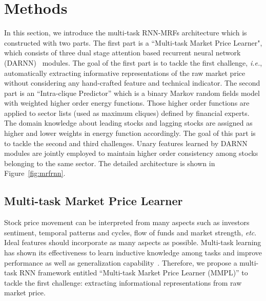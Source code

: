 \section{Methods}
\label{sec:meth}

In this section, we introduce the multi-task RNN-MRFs
architecture which is constructed with two parts. The first part
is a ``Multi-task Market Price Learner", which consists of three
dual stage attention based recurrent neural network
(DARNN)~\cite{qin2017dual} modules. The goal of the first part is
to tackle the first challenge, \textit{i.e.}, automatically
extracting informative representations of the raw market price
without considering any hand-crafted feature and technical
indicator. The second part is an ``Intra-clique Predictor'' which
is a binary Markov random fields model with
weighted higher order energy functions. Those higher order
functions are applied to sector lists (used as maximum cliques)
defined by financial experts. The domain knowledge about leading
stocks and lagging stocks are assigned as higher and lower
weights in energy function accordingly. The goal of this part is
to tackle the second and third challenges. Unary features learned
by DARNN modules are jointly employed to maintain higher order
consistency among stocks belonging to the same sector. The
detailed architecture is shown in Figure~\ref{fig:mrfrnn}.


\subsection{Multi-task Market Price Learner}
\label{sec:mmpl}


Stock price movement can be interpreted from many aspects such as
investors sentiment, temporal patterns and cycles, flow of funds
and market strength, \textit{etc}. Ideal features should
incorporate as many aspects as possible. Multi-task learning
has shown its effectiveness to learn inductive knowledge among
tasks and improve performance as well as generalization
capability~\cite{caruana1993multitask}. Therefore, we propose a
multi-task RNN framework entitled ``Multi-task Market Price
Learner (MMPL)'' to tackle the first challenge: extracting
informational representations from raw market price.

